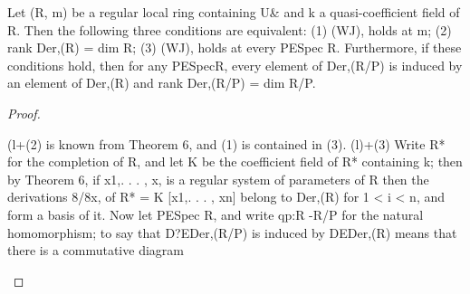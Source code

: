 \begin{theorem}[Theorem 30.8]\label{mcrt-auto-theorem-30-8}
\begin{mathematicalrecord}
Let (R, m) be a regular local ring containing          U& and k a
quasi-coefficient field of R. Then the following three conditions are
equivalent:
    (1) (WJ), holds at m;
    (2) rank Der,(R) = dim R;
    (3) (WJ), holds at every PESpec R.
Furthermore, if these conditions hold, then for any PESpecR, every
element of Der,(R/P) is induced by an element of Der,(R) and
           rank Der,(R/P) = dim R/P.
\end{mathematicalrecord}
\end{theorem}
\begin{proof}
\begin{mathematicalrecord}
(l+(2)      is known from Theorem 6, and (1) is contained in (3).
    (l)+(3) Write R* for the completion of R, and let K be the coefficient
field of R* containing k; then by Theorem 6, if x1,. . . , x, is a regular system
of parameters of R then the derivations 8/8x, of R* = K [x1,. . . , xn] belong
to Der,(R) for 1 < i < n, and form a basis of it. Now let PESpec R, and write
qp:R -R/P       for the natural homomorphism;       to say that D?EDer,(R/P)
is induced by DEDer,(R) means that there is a commutative diagram





\end{mathematicalrecord}
\end{proof}
